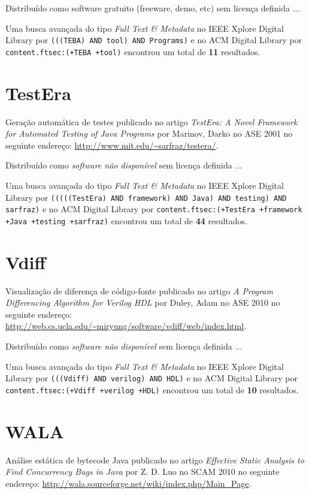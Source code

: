 Distribuído como software gratuito (freeware, demo, etc)
sem licença definida ...


Uma busca avançada do tipo {\it Full Text \& Metadata} no IEEE Xplore Digital Library por
\texttt{(((TEBA) AND tool) AND Programs)}
e no ACM Digital Library por
\texttt{content.ftsec:(+TEBA +tool)}
encontrou um total de
{\bf 11}
resultados.

\section{TestEra}

Geração automática de testes
publicado no artigo
{\it TestEra: A Novel Framework for Automated Testing of Java Programs}
por
Marinov, Darko
no
ASE
2001
no seguinte endereço:
\url{http://www.mit.edu/~sarfraz/testera/}.

Distribuído como {\it software não disponível}
sem licença definida ...


Uma busca avançada do tipo {\it Full Text \& Metadata} no IEEE Xplore Digital Library por
\texttt{(((((TestEra) AND framework) AND Java) AND testing) AND sarfraz)}
e no ACM Digital Library por
\texttt{content.ftsec:(+TestEra +framework +Java +testing +sarfraz)}
encontrou um total de
{\bf 44}
resultados.

\section{Vdiff}

Visualização de diferença de código-fonte
publicado no artigo
{\it A Program Differencing Algorithm for Verilog HDL}
por
Duley, Adam
no
ASE
2010
no seguinte endereço:
\url{http://web.cs.ucla.edu/~miryung/software/vdiff/web/index.html}.

Distribuído como {\it software não disponível}
sem licença definida ...


Uma busca avançada do tipo {\it Full Text \& Metadata} no IEEE Xplore Digital Library por
\texttt{(((Vdiff) AND verilog) AND HDL)}
e no ACM Digital Library por
\texttt{content.ftsec:(+Vdiff +verilog +HDL)}
encontrou um total de
{\bf 10}
resultados.

\section{WALA}

Análise estática de bytecode Java
publicado no artigo
{\it Effective Static Analysis to Find Concurrency Bugs in Java}
por
Z. D. Luo
no
SCAM
2010
no seguinte endereço:
\url{http://wala.sourceforge.net/wiki/index.php/Main_Page}.

